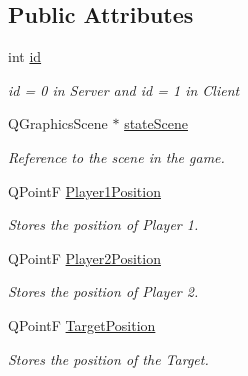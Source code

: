 \subsection*{Public Attributes}
\begin{DoxyCompactItemize}
\item 
\mbox{\label{classgamestate_acb59a99cf8d8582c1f9f81a83f2f5f73}} 
int \hyperlink{classgamestate_acb59a99cf8d8582c1f9f81a83f2f5f73}{id}
\begin{DoxyCompactList}\small\item\em id = 0 in Server and id = 1 in Client \end{DoxyCompactList}\item 
\mbox{\label{classgamestate_a54c8ade27ab0bc446c9c178d15a2e9c5}} 
Q\+Graphics\+Scene $\ast$ \hyperlink{classgamestate_a54c8ade27ab0bc446c9c178d15a2e9c5}{state\+Scene}
\begin{DoxyCompactList}\small\item\em Reference to the scene in the game. \end{DoxyCompactList}\item 
\mbox{\label{classgamestate_a5c3589f6ddece131a18e3c725c0deace}} 
Q\+PointF \hyperlink{classgamestate_a5c3589f6ddece131a18e3c725c0deace}{Player1\+Position}
\begin{DoxyCompactList}\small\item\em Stores the position of Player 1. \end{DoxyCompactList}\item 
\mbox{\label{classgamestate_a27d4875191db36c69f2c1e0604ebf36f}} 
Q\+PointF \hyperlink{classgamestate_a27d4875191db36c69f2c1e0604ebf36f}{Player2\+Position}
\begin{DoxyCompactList}\small\item\em Stores the position of Player 2. \end{DoxyCompactList}\item 
\mbox{\label{classgamestate_a5767b07aaa2c0bd46ff55795be98b440}} 
Q\+PointF \hyperlink{classgamestate_a5767b07aaa2c0bd46ff55795be98b440}{Target\+Position}
\begin{DoxyCompactList}\small\item\em Stores the position of the Target. \end{DoxyCompactList}\item 

\end{DoxyCompactItemize}
